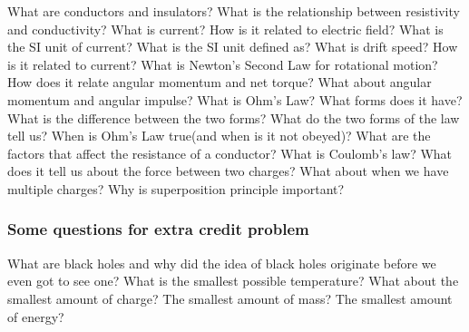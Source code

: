 \documentclass[13pt,addpoints]{exam}
\begin{document}
\begin{questions}
					\question What are conductors and insulators? What is the relationship between resistivity and conductivity?
					\question What is current? How is it related to electric field? What is the SI unit of current? What is the SI unit defined as? What is drift speed? How is it related to current?
					\question What is Newton's Second Law for rotational motion? How does it relate angular momentum and net torque? What about angular momentum and angular impulse?
					\question What is Ohm's Law? What forms does it have? What is the difference between the two forms? What do the two forms of the law tell us? When is Ohm's Law true(and when is it not obeyed)? What are the factors that affect the resistance of a conductor?
					\question What is Coulomb's law? What does it tell us about the force between two charges? What about when we have multiple charges? Why is superposition principle important?
					\subsubsection*{Some questions for extra credit problem}
					\question What are black holes and why did the idea of black holes originate before we even got to see one? 
					\question What is the smallest possible temperature? What about the smallest amount of charge? The smallest amount of mass? The smallest amount of energy?
				\end{questions}
			
\end{document}

